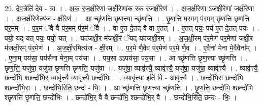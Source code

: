 \documentclass[17pt]{extarticle}
\begin{document}
29. दे॒व॒त्रेति॑ देव - त्रा । . अ॒क॒ र॒ज॒क्षी॒रेणा॑ जक्षी॒रेणा॑क रक रजक्षी॒रेण॑ । . अ॒ज॒क्षी॒रेणा ऽज॑क्षी॒रेणा॑ जक्षी॒रेणा । . अ॒ज॒क्षी॒रेणेत्य॑ज - क्षी॒रेण॑ । . आ च्छृ॑णत्ति छृण॒त्त्या च्छृ॑णत्ति । . छृ॒ण॒त्ति॒ प॒र॒मम् प॑र॒मम् छृ॑णत्ति छृणत्ति पर॒मम् । . प॒र॒मं ॅवै वै प॑र॒मम् प॑र॒मं ॅवै । . वा ए॒त दे॒तद् वै वा ए॒तत् । . ए॒तत् पयः॒ पय॑ ए॒त दे॒तत् पयः॑ । . पयो॒ यद् यत् पयः॒ पयो॒ यत् । . यद॑जक्षी॒र म॑जक्षी॒रं ॅयद् यद॑जक्षी॒रम् । . अ॒ज॒क्षी॒रम् प॑र॒मेण॑ पर॒मेणा॑ जक्षी॒र म॑जक्षी॒रम् प॑र॒मेण॑ । . अ॒ज॒क्षी॒रमित्य॑ज - क्षी॒रम् । . प॒र॒मे णै॒वैव प॑र॒मेण॑ पर॒मे णै॒व । . ए॒वैना॑ मेना मे॒वैवैना᳚म् । . ए॒ना॒म् पय॑सा॒ पय॑सैना मेना॒म् पय॑सा । . पय॒सा ऽऽपय॑सा॒ पय॒सा । . आ च्छृ॑णत्ति छृण॒त्त्या च्छृ॑णत्ति । . छृ॒ण॒त्ति॒ यजु॑षा॒ यजु॑षा छृणत्ति छृणत्ति॒ यजु॑षा । . यजु॑षा॒ व्यावृ॑त्त्यै॒ व्यावृ॑त्त्यै॒ यजु॑षा॒ यजु॑षा॒ व्यावृ॑त्त्यै । . व्यावृ॑त्त्यै॒ छन्दो॑भि॒ श्छन्दो॑भि॒र् व्यावृ॑त्त्यै॒ व्यावृ॑त्त्यै॒ छन्दो॑भिः । . व्यावृ॑त्त्या॒ इति॑ वि - आवृ॑त्त्यै । . छन्दो॑भि॒रा छन्दो॑भि॒ श्छन्दो॑भि॒रा । . छन्दो॑भि॒रिति॒ छन्दः॑ - भिः॒ । . आ च्छृ॑णत्ति छृण॒त्त्या च्छृ॑णत्ति । . छृ॒ण॒त्ति॒ छन्दो॑भि॒ श्छन्दो॑भि श्छृणत्ति छृणत्ति॒ छन्दो॑भिः । . छन्दो॑भि॒र् वै वै छन्दो॑भि॒ श्छन्दो॑भि॒र् वै । . छन्दो॑भि॒रिति॒ छन्दः॑ - भिः॒ । \newline
\end{document}
